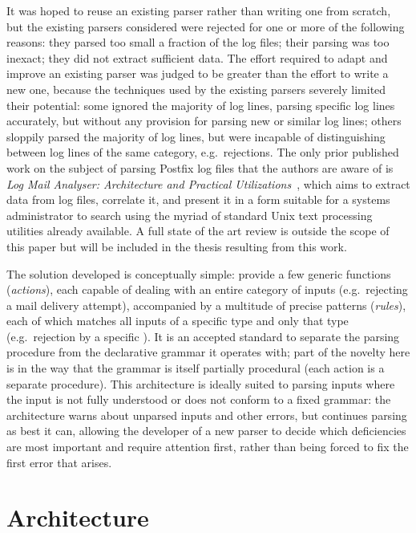 \documentclass{svmult}
\begin{document}
It was hoped to reuse an existing parser rather than writing one from
scratch, but the existing parsers considered were rejected for one or more
of the following reasons: they parsed too small a fraction of the log
files; their parsing was too inexact; they did not extract sufficient data.
The effort required to adapt and improve an existing parser was judged to
be greater than the effort to write a new one, because the techniques used
by the existing parsers severely limited their potential: some ignored the
majority of log lines, parsing specific log lines accurately, but without
any provision for parsing new or similar log lines; others sloppily parsed
the majority of log lines, but were incapable of distinguishing between log
lines of the same category, e.g.\ rejections.  The only prior published
work on the subject of parsing Postfix log files that the authors are aware
of is \textit{Log Mail Analyser: Architecture and Practical
Utilizations\/}~\cite{log-mail-analyser}, which aims to extract data from
log files, correlate it, and present it in a form suitable for a systems
administrator to search using the myriad of standard Unix text processing
utilities already available.  A full state of the art review is outside the
scope of this paper but will be included in the thesis resulting from this
work.

The solution developed is conceptually simple: provide a few generic
functions (\textit{actions\/}), each capable of dealing with an entire
category of inputs (e.g.\ rejecting a mail delivery attempt), accompanied
by a multitude of precise patterns (\textit{rules\/}), each of which
matches all inputs of a specific type and only that type (e.g.\ rejection
by a specific \DNSBL{}).  It is an accepted standard to separate the
parsing procedure from the declarative grammar it operates with; part of
the novelty here is in the way that the grammar is itself partially
procedural (each action is a separate procedure).  This architecture is
ideally suited to parsing inputs where the input is not fully understood or
does not conform to a fixed grammar: the architecture warns about unparsed
inputs and other errors, but continues parsing as best it can, allowing the
developer of a new parser to decide which deficiencies are most important
and require attention first, rather than being forced to fix the first
error that arises.

\section{Architecture}
\end{document}
